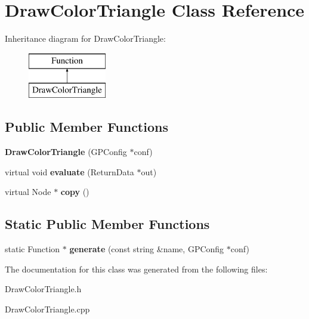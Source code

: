 \hypertarget{class_draw_color_triangle}{\section{Draw\-Color\-Triangle Class Reference}
\label{class_draw_color_triangle}
}
Inheritance diagram for Draw\-Color\-Triangle\-:\begin{figure}[H]
\begin{center}
\leavevmode
\includegraphics[height=2.000000cm]{class_draw_color_triangle}
\end{center}
\end{figure}
\subsection*{Public Member Functions}
\begin{DoxyCompactItemize}
\item 
\hypertarget{class_draw_color_triangle_a0bbb6e498405631981f2af8c30bed2a3}{{\bfseries Draw\-Color\-Triangle} (G\-P\-Config $\ast$conf)}\label{class_draw_color_triangle_a0bbb6e498405631981f2af8c30bed2a3}

\item 
\hypertarget{class_draw_color_triangle_a015d98a34270b2e0d50abc398cec39e3}{virtual void {\bfseries evaluate} (Return\-Data $\ast$out)}\label{class_draw_color_triangle_a015d98a34270b2e0d50abc398cec39e3}

\item 
\hypertarget{class_draw_color_triangle_a8854b0eedda24cb7e68088ea04fa3d31}{virtual Node $\ast$ {\bfseries copy} ()}\label{class_draw_color_triangle_a8854b0eedda24cb7e68088ea04fa3d31}

\end{DoxyCompactItemize}
\subsection*{Static Public Member Functions}
\begin{DoxyCompactItemize}
\item 
\hypertarget{class_draw_color_triangle_aafd3098c23fae0a80e8aae9297b9e490}{static Function $\ast$ {\bfseries generate} (const string \&name, G\-P\-Config $\ast$conf)}\label{class_draw_color_triangle_aafd3098c23fae0a80e8aae9297b9e490}

\end{DoxyCompactItemize}


The documentation for this class was generated from the following files\-:\begin{DoxyCompactItemize}
\item 
Draw\-Color\-Triangle.\-h\item 
Draw\-Color\-Triangle.\-cpp\end{DoxyCompactItemize}
